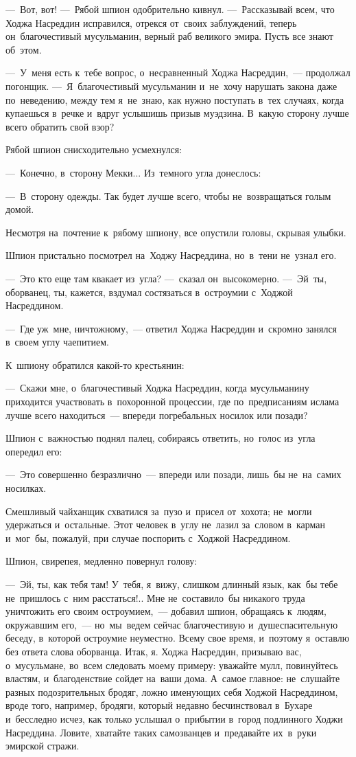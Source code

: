 \documentclass[12pt,a4paper]{book}
\begin{document}
—~Вот, вот! —~Рябой шпион одобрительно кивнул. —~Рассказывай всем, что Ходжа Насреддин исправился, отрекся от~своих заблуждений, теперь он~благочестивый мусульманин, верный раб великого эмира. Пусть все знают об~этом.

—~У~меня есть к~тебе вопрос, о~несравненный Ходжа Насреддин,~— продолжал погонщик. —~Я~благочестивый мусульманин и~не~хочу нарушать закона даже по~неведению, между тем я~не~знаю, как нужно поступать в~тех случаях, когда купаешься в~речке и~вдруг услышишь призыв муэдзина. В~какую сторону лучше всего обратить свой взор?

Рябой шпион снисходительно усмехнулся:

—~Конечно, в~сторону Мекки... Из~темного угла донеслось:

—~В~сторону одежды. Так будет лучше всего, чтобы не~возвращаться голым домой.

Несмотря на~почтение к~рябому шпиону, все опустили головы, скрывая улыбки.

Шпион пристально посмотрел на~Ходжу Насреддина, но~в~тени не~узнал его.

—~Это кто еще там квакает из~угла? —~сказал он~высокомерно. —~Эй~ты, оборванец, ты, кажется, вздумал состязаться в~остроумии с~Ходжой Насреддином.

—~Где уж~мне, ничтожному,~— ответил Ходжа Насреддин и~скромно занялся в~своем углу чаепитием.

К~шпиону обратился какой-то крестьянин:

—~Скажи мне, о~благочестивый Ходжа Насреддин, когда мусульманину приходится участвовать в~похоронной процессии, где по~предписаниям ислама лучше всего находиться~— впереди погребальных носилок или позади?

Шпион с~важностью поднял палец, собираясь ответить, но~голос из~угла опередил его:

—~Это совершенно безразлично~— впереди или позади, лишь~бы не~на~самих носилках.

Смешливый чайханщик схватился за~пузо и~присел от~хохота; не~могли удержаться и~остальные. Этот человек в~углу не~лазил за~словом в~карман и~мог~бы, пожалуй, при случае поспорить с~Ходжой Насреддином.

Шпион, свирепея, медленно повернул голову:

—~Эй, ты, как тебя там! У~тебя, я~вижу, слишком длинный язык, как~бы тебе не~пришлось с~ним расстаться!.. Мне не~составило~бы никакого труда уничтожить его своим остроумием,~— добавил шпион, обращаясь к~людям, окружавшим его,~— но~мы~ведем сейчас благочестивую и~душеспасительную беседу, в~которой остроумие неуместно. Всему свое время, и~поэтому я~оставлю без ответа слова оборванца. Итак, я. Ходжа Насреддин, призываю вас, о~мусульмане, во~всем следовать моему примеру: уважайте мулл, повинуйтесь властям, и~благоденствие сойдет на~ваши дома. А~самое главное: не~слушайте разных подозрительных бродяг, ложно именующих себя Ходжой Насреддином, вроде того, например, бродяги, который недавно бесчинствовал в~Бухаре и~бесследно исчез, как только услышал о~прибытии в~город подлинного Ходжи Насреддина. Ловите, хватайте таких самозванцев и~предавайте их~в~руки эмирской стражи.
\end{document}
